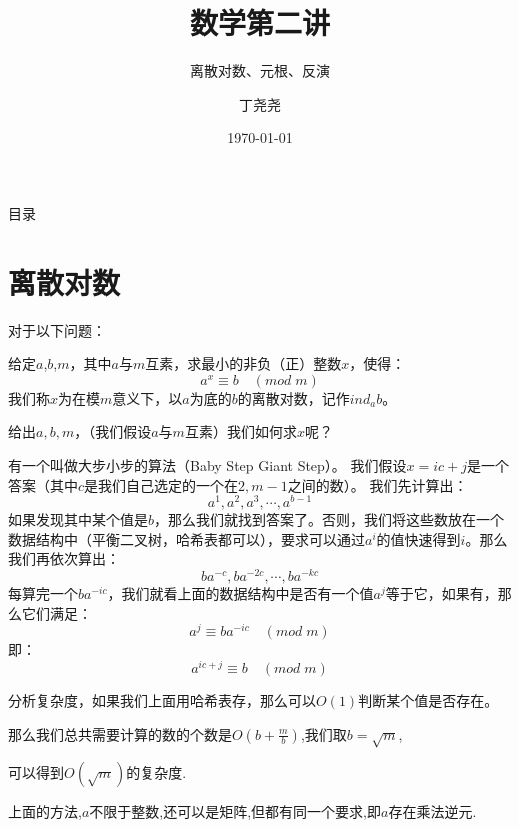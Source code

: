 \documentclass[9pt]{beamer}
\title{数学第二讲}
\subtitle{离散对数、元根、反演}
\author{丁尧尧}
\institute{上海交通大学}
\date{\today}
\begin{document}
	\maketitle
	\begin{frame}{目录}
		\tableofcontents
	\end{frame}
	
	\section{离散对数}
		\begin{frame}
			对于以下问题：
			\begin{definition}[离散对数]
				给定$a$,$b$,$m$，其中$a$与$m$互素，求最小的非负（正）整数$x$，使得：
				$$
				a^x \equiv b \quad (mod \; m)
				$$
				我们称$x$为在模$m$意义下，以$a$为底的$b$的离散对数，记作$ind_ab$。
			\end{definition}
			给出$a,b,m$，（我们假设$a$与$m$互素）我们如何求$x$呢？
		\end{frame}
		\begin{frame}
			有一个叫做大步小步的算法（Baby Step Giant Step）。
			我们假设$x = ic + j$是一个答案（其中$c$是我们自己选定的一个在$2,m-1$之间的数）。
			我们先计算出：
			$$
			a^1, a^2, a^3, \cdots, a^{b-1}
			$$			
			如果发现其中某个值是$b$，那么我们就找到答案了。否则，我们将这些数放在一个数据结构中（平衡二叉树，哈希表都可以），要求可以通过$a^i$的值快速得到$i$。那么我们再依次算出：
			$$
			ba^{-c}, ba^{-2c}, \cdots, ba^{-kc}
			$$
			每算完一个$ba^{-ic}$，我们就看上面的数据结构中是否有一个值$a^j$等于它，如果有，那么它们满足：
			$$
			a^j \equiv ba^{-ic} \quad (mod \; m)
			$$
			即：
			$$
			a^{ic + j} \equiv b \quad (mod \; m)
			$$
		\end{frame}
		\begin{frame}
			分析复杂度，如果我们上面用哈希表存，那么可以$O(1)$判断某个值是否存在。
			
			那么我们总共需要计算的数的个数是$O(b + \frac{m}{b})$,我们取$b = \sqrt{m}$,
			
			可以得到$O(\sqrt{m})$的复杂度.
			
			上面的方法,$a$不限于整数,还可以是矩阵,但都有同一个要求,即$a$存在乘法逆元.
		\end{frame}
\end{document}
